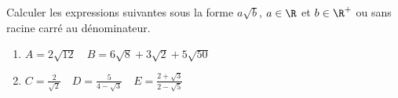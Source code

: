 
Calculer les expressions suivantes sous la forme $a\sqrt{b}$, $a\in \R$ et $b \in \R^+$ ou sans racine carré au dénominateur.
\begin{enumerate}
\item $A=2\sqrt{12} \quad B= 6\sqrt{8} + 3\sqrt{2} + 5\sqrt{50}$
\item $C=\frac{2}{\sqrt{2}} \quad D= \frac{5}{4 - \sqrt{3}} \quad E= \frac{2+\sqrt{3}}{2 - \sqrt{5}} $
\end{enumerate}